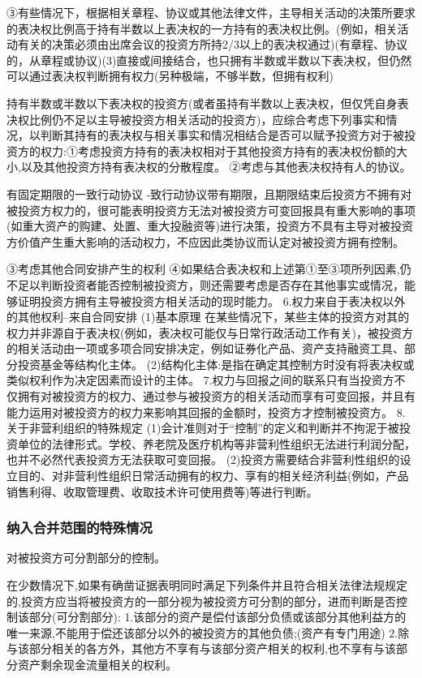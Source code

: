 \documentclass[UTF8,12pt]{ctexart}
\numberwithin{equation}{section} %
\numberwithin{figure}{section}
\numberwithin{table}{section}
\begin{document}
	③有些情况下，根据相关章程、协议或其他法律文件，主导相关活动的决策所要求的表决权比例高于持有半数以上表决权的一方持有的表决权比例。(例如，相关活动有关的决策必须由出席会议的投资方所持2/3以上的表决权通过)(有章程、协议的，从章程或协议)(3)直接或间接结合，也只拥有半数或半数以下表决权，但仍然可以通过表决权判断拥有权力(另种极端，不够半数，但拥有权利)
	
	持有半数或半数以下表决权的投资方(或者虽持有半数以上表决权，但仅凭自身表决权比例仍不足以主导被投资方相关活动的投资方)，应综合考虑下列事实和情况，以判断其持有的表决权与相关事实和情况相结合是否可以赋予投资方对于被投资方的权力:①考虑投资方持有的表决权相对于其他投资方持有的表决权份额的大小,以及其他投资方持有表决权的分散程度。
	②考虑与其他表决权持有人的协议。
	
	有固定期限的一致行动协议
	-致行动协议带有期限，且期限结束后投资方不拥有对被投资方权力的，很可能表明投资方无法对被投资方可变回报具有重大影响的事项(如重大资产的购建、处置、重大投融资等)进行决策，投资方不具有主导对被投资方价值产生重大影响的活动权力，不应因此类协议而认定对被投资方拥有控制。
	
	③考虑其他合同安排产生的权利
	④如果结合表决权和上述第①至③项所列因素,仍不足以判断投资者能否控制被投资方，则还需要考虑是否存在其他事实或情况，能够证明投资方拥有主导被投资方相关活动的现时能力。
	6.权力来自于表决权以外的其他权利--来自合同安排
	(1)基本原理
	在某些情况下，某些主体的投资方对其的权力并非源自于表决权(例如，表决权可能仅与日常行政活动工作有关)，被投资方的相关活动由一项或多项合同安排决定，例如证券化产品、资产支持融资工具、部分投资基金等结构化主体。
	(2)结构化主体:是指在确定其控制方时没有将表决权或类似权利作为决定因素而设计的主体。
	7.权力与回报之间的联系只有当投资方不仅拥有对被投资方的权力、通过参与被投资方的相关活动而享有可变回报，并且有能力运用对被投资方的权力来影响其回报的金额时，投资方才控制被投资方。
	8.关于非营利组织的特殊规定
	(1)会计准则对于“控制”的定义和判断并不拘泥于被投资单位的法律形式。学校、养老院及医疗机构等非营利性组织无法进行利润分配，也并不必然代表投资方无法获取可变回报。
	(2)投资方需要结合非营利性组织的设立目的、对非营利性组织日常活动拥有的权力、享有的相关经济利益(例如，产品销售利得、收取管理费、收取技术许可使用费等)等进行判断。
	
	\subsubsection{纳入合并范围的特殊情况}
	对被投资方可分割部分的控制。
	
	在少数情况下,如果有确凿证据表明同时满足下列条件并且符合相关法律法规规定的,投资方应当将被投资方的一部分视为被投资方可分割的部分，进而判断是否控制该部分(可分割部分):
	1.该部分的资产是偿付该部分负债或该部分其他利益方的唯一来源,不能用于偿还该部分以外的被投资方的其他负债;(资产有专门用途)
	2.除与该部分相关的各方外，其他方不享有与该部分资产相关的权利,也不享有与该部分资产剩余现金流量相关的权利。
	
\end{document}
